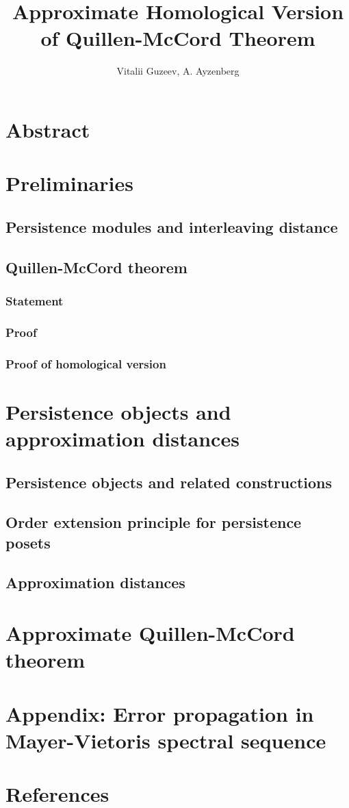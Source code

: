 \documentclass[a4paper, 12pt]{article}
\title{Approximate Homological Version of Quillen-McCord Theorem}
\author{Vitalii Guzeev, A. Ayzenberg}
\theoremstyle{definition}
\theoremstyle{remark}
\begin{document}
\section{Abstract}


\section{Preliminaries}

\subsection{Persistence modules and interleaving distance}


\subsection{Quillen-McCord theorem}

\subsubsection{Statement}


\subsubsection{Proof}


\subsubsection{Proof of homological version}


\section{Persistence objects and approximation distances}

\subsection{Persistence objects and related constructions}


\subsection{Order extension principle for persistence posets}


\subsection{Approximation distances}


\section{Approximate Quillen-McCord theorem}


\section{Appendix: Error propagation in Mayer-Vietoris spectral sequence}


\section{References}

\end{document}
